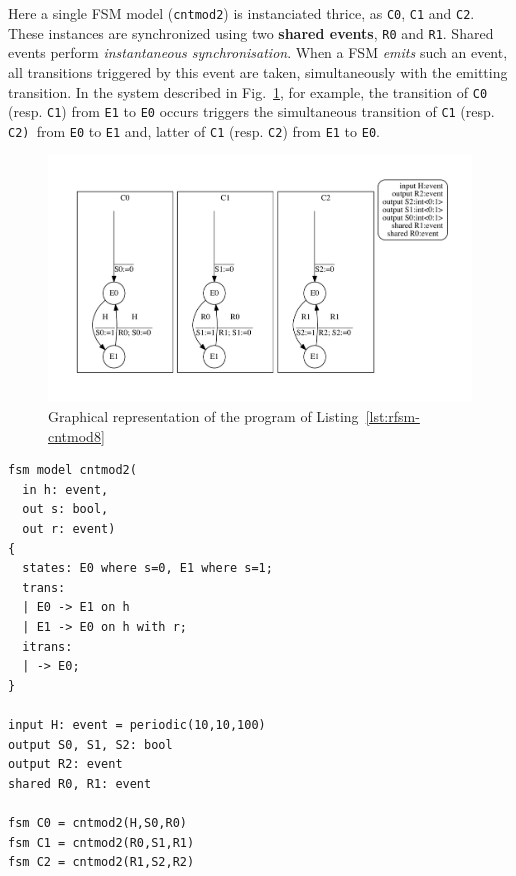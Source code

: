 Here a single FSM model (\texttt{cntmod2}) is instanciated thrice, as \texttt{C0}, \texttt{C1} and
\texttt{C2}. These instances are synchronized using two \textbf{shared events}, \texttt{R0} and \texttt{R1}. 
Shared events perform \emph{instantaneous synchronisation}. When a FSM \emph{emits} such an event, all transitions
triggered by this event are taken, simultaneously with the emitting transition. In the system
described in Fig.~\ref{fig:rfsm-cntmod8}, for example, the transition of \texttt{C0}
(resp. \texttt{C1}) from \texttt{E1} to \texttt{E0} occurs triggers the simultaneous transition of
\texttt{C1} (resp. \texttt{C2) }from \texttt{E0} to \texttt{E1} and, latter of \texttt{C1}
(resp. \texttt{C2}) from \texttt{E1} to \texttt{E0}.

\begin{figure}
  \centering
\includegraphics[width=\textwidth]{figs/ctrmod8-top}
  \caption{Graphical representation of the program of Listing~\ref{lst:rfsm-cntmod8}}
  \label{fig:rfsm-cntmod8}
\end{figure}

\begin{minipage}[c]{0.95\textwidth}
\begin{lstlisting}[frame=single,language=Rfsm,
  caption={A program involving three FSM instances synchronized by a shared event},
  label={lst:rfsm-cntmod8}]
fsm model cntmod2(
  in h: event,
  out s: bool,
  out r: event)
{
  states: E0 where s=0, E1 where s=1;
  trans:
  | E0 -> E1 on h
  | E1 -> E0 on h with r;
  itrans:
  | -> E0;
}

input H: event = periodic(10,10,100)
output S0, S1, S2: bool
output R2: event
shared R0, R1: event

fsm C0 = cntmod2(H,S0,R0) 
fsm C1 = cntmod2(R0,S1,R1) 
fsm C2 = cntmod2(R1,S2,R2) 
\end{lstlisting}
\end{minipage}

